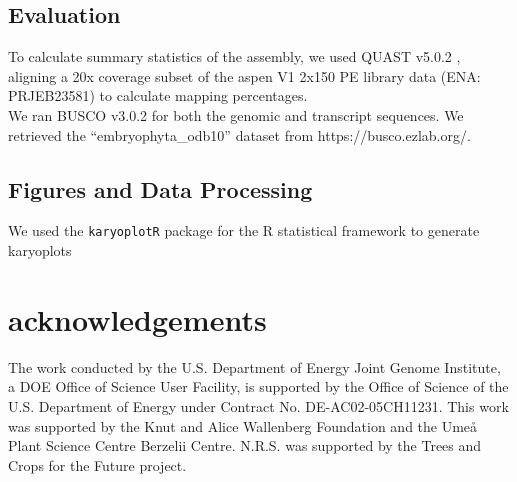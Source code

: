 \documentclass{article}
\begin{document}
\subsection{Evaluation}
To calculate summary statistics of the assembly, we used QUAST v5.0.2 \citep{gurevich2013quast}, aligning a 20x coverage subset of the aspen V1 2x150 PE library data (ENA: PRJEB23581) to calculate mapping percentages.\\
We ran BUSCO v3.0.2 for both the genomic and transcript sequences. We retrieved the ``embryophyta\_odb10'' dataset from {https://busco.ezlab.org/}.\\

\subsection{Figures and Data Processing}
We used the \verb|karyoplotR| \citep{gel2017karyoploter} package for the R statistical framework \citep{team2019language} to generate karyoplots

\section{acknowledgements}
The work conducted by the U.S. Department of Energy Joint Genome Institute, a DOE Office of Science User Facility, is supported by the Office of Science of the U.S. Department of Energy under Contract No. DE-AC02-05CH11231. This work was supported by the Knut and Alice Wallenberg Foundation and the Umeå Plant Science Centre Berzelii Centre. N.R.S. was supported by the Trees and Crops for the Future project.


 

\end{document}
